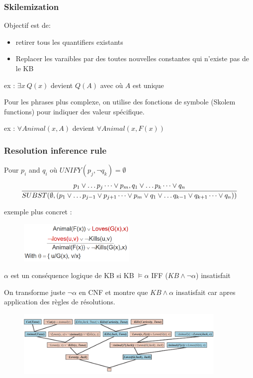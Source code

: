 \documentclass[12pt]{article}
\begin{document}
		\subsubsection{Skilemization}
			Objectif est de:
			\begin{itemize}
				\item retirer tous les quantifiers existants
				\item Replacer les varaibles par des toutes nouvelles constantes qui n'existe pas de le KB
			\end{itemize}			 
			
			ex : $\exists x \ Q(x)$ devient $Q(A)$ avec où $A$ est unique
			
			Pour les phrases plus complexe, on utilise des fonctions de symbole (Skolem functions) pour indiquer des valeur  spécifique.
			
			ex : $\forall Animal(x,A)$ devient $\forall Animal(x,F(x))$
			
		\subsubsection{Resolution inference rule}
			Pour $p_i$ and $q_i$ où $UNIFY(p_j, \neg q_k) = \emptyset$
			\begin{equation}
				\cfrac{p_1 \lor \dots p_j \dots \lor p_m, q_1 \lor \dots p_k \dots \lor q_n}{SUBST(\emptyset,(p_1 \lor \dots p_{j-1} \lor p_{j+1} \dots \lor p_m \lor q_1 \lor \dots q_{k-1} \lor q_{k+1} \dots \lor q_n))}
			\end{equation}
			
			exemple plus concret :
			
			\begin{figure}[htp]	
				\centering
				\includegraphics[width=0.5\textwidth]{img/RIR.png}
			\end{figure}	
			
			$\alpha$ est un conséquence logique de KB si KB $\models \alpha$ IFF ($KB \land \neg \alpha$) insatisfait
			
			On transforme juste $\neg \alpha$ en CNF et montre que $KB \land \alpha$ insatisfait car apres application des règles de résolutions.
			
			\begin{figure}[htp]	
				\centering
				\includegraphics[width=0.9\textwidth]{img/RIR1.png}
			\end{figure}
			
\end{document}
